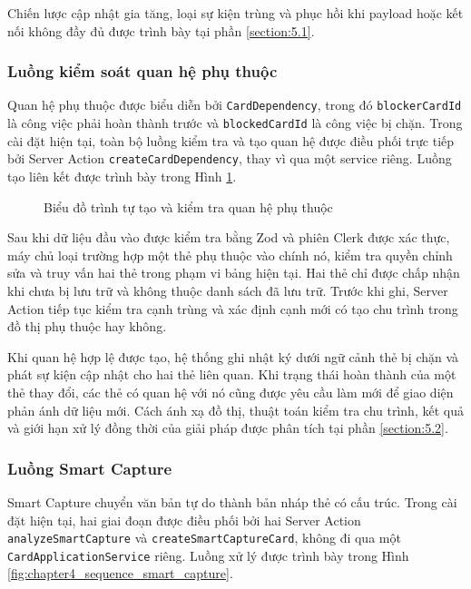 \documentclass[../DoAn.tex]{subfiles}
\begin{document}
Chiến lược cập nhật gia tăng, loại sự kiện trùng và phục hồi khi payload hoặc kết nối không đầy đủ được trình bày tại phần \ref{section:5.1}.

\subsubsection{Luồng kiểm soát quan hệ phụ thuộc}
\label{subsubsection:4.2.2.d}

Quan hệ phụ thuộc được biểu diễn bởi \texttt{CardDependency}, trong đó \texttt{blockerCardId} là công việc phải hoàn thành trước và \texttt{blockedCardId} là công việc bị chặn. Trong cài đặt hiện tại, toàn bộ luồng kiểm tra và tạo quan hệ được điều phối trực tiếp bởi Server Action \texttt{createCardDependency}, thay vì qua một service riêng. Luồng tạo liên kết được trình bày trong Hình \ref{fig:chapter4_sequence_dependency}.

\begin{figure}[H]
    \centering
    \caption{Biểu đồ trình tự tạo và kiểm tra quan hệ phụ thuộc}
    \label{fig:chapter4_sequence_dependency}
\end{figure}

Sau khi dữ liệu đầu vào được kiểm tra bằng Zod và phiên Clerk được xác thực, máy chủ loại trường hợp một thẻ phụ thuộc vào chính nó, kiểm tra quyền chỉnh sửa và truy vấn hai thẻ trong phạm vi bảng hiện tại. Hai thẻ chỉ được chấp nhận khi chưa bị lưu trữ và không thuộc danh sách đã lưu trữ. Trước khi ghi, Server Action tiếp tục kiểm tra cạnh trùng và xác định cạnh mới có tạo chu trình trong đồ thị phụ thuộc hay không.

Khi quan hệ hợp lệ được tạo, hệ thống ghi nhật ký dưới ngữ cảnh thẻ bị chặn và phát sự kiện cập nhật cho hai thẻ liên quan. Khi trạng thái hoàn thành của một thẻ thay đổi, các thẻ có quan hệ với nó cũng được yêu cầu làm mới để giao diện phản ánh dữ liệu mới. Cách ánh xạ đồ thị, thuật toán kiểm tra chu trình, kết quả và giới hạn xử lý đồng thời của giải pháp được phân tích tại phần \ref{section:5.2}.

\subsubsection{Luồng Smart Capture}
\label{subsubsection:4.2.2.e}

Smart Capture chuyển văn bản tự do thành bản nháp thẻ có cấu trúc. Trong cài đặt hiện tại, hai giai đoạn được điều phối bởi hai Server Action \texttt{analyzeSmartCapture} và \texttt{createSmartCaptureCard}, không đi qua một \texttt{CardApplicationService} riêng. Luồng xử lý được trình bày trong Hình \ref{fig:chapter4_sequence_smart_capture}.
\end{document}
